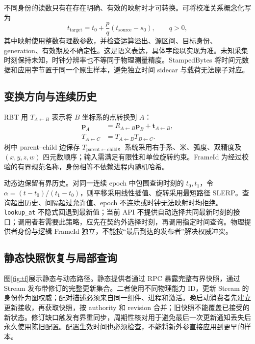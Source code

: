 \documentclass[UTF8,fontset=none,zihao=-4,a4paper]{ctexart}
\newcommand{\code}[1]{\texttt{#1}}
\begin{document}
不同身份的读数只有在存在明确、有效的映射时才可转换。可将校准关系概念化写为
\begin{equation}
 t_{\mathrm{target}}=t_0+\frac{p}{q}(t_{\mathrm{source}}-s_0),
 \qquad q>0,
\end{equation}
其中映射使用整数有理数参数，并检查运算溢出、源区间、目标身份、generation、有效期及不确定性。这是语义表达，具体字段以实现为准。未知采集时刻保持未知，时钟分辨率也不等同于物理测量精度。StampedBytes 将时间元数据和应用字节置于同一个原生样本，避免独立时间 sidecar 与载荷无法原子对应\cite{rbttime}。

\subsection{变换方向与连续历史}
RBT 用 $T_{A\leftarrow B}$ 表示将 $B$ 坐标系的点转换到 $A$：
\begin{align}
 \mathbf p_A &= R_{A\leftarrow B}\mathbf p_B+\mathbf t_{A\leftarrow B},\\
 T_{A\leftarrow C} &= T_{A\leftarrow B}T_{B\leftarrow C}.
\end{align}
树中 parent--child 边保存 $T_{\mathrm{parent}\leftarrow\mathrm{child}}$。系统采用右手系、米、弧度、双精度及 $(x,y,z,w)$ 四元数顺序；输入需满足有限性和单位旋转约束。FrameId 为经过校验的有界规范名称，身份相等不依赖进程内随机哈希。

动态边保留有界历史。对同一连续 epoch 中包围查询时刻的 $t_0,t_1$，令 $\alpha=(t-t_0)/(t_1-t_0)$，则平移采用线性插值、旋转采用最短路径 SLERP。查询超出历史、间隔超过允许值、epoch 不连续或时钟无法映射时均拒绝。\code{lookup\_at} 不隐式回退到最新值；当前 API 不提供自动选择共同最新时刻的接口；调用者若需要此策略，应先在契约外选择时刻，再调用指定时间查询。物理提供者身份与逻辑 FrameId 独立，不能按“最后到达的发布者”解决权威冲突。

\subsection{静态快照恢复与局部查询}
图\ref{fig:tf}展示静态与动态路径。静态提供者通过 RPC 暴露完整有界快照，通过 Stream 发布带修订的完整更新集合。二者使用不同物理能力 ID，更新 Stream 的身份作为图权威；配对描述必须来自同一组件、进程和激活。晚启动消费者先建立更新接收，再获取快照，按 authority 和 revision 合并；旧快照不能覆盖已接受的新状态。修订缺口触发有界重同步，周期性核对用于避免最后一次更新通知丢失后永久使用陈旧配置。配置生效时间也必须检查，不能将新外参直接应用到更早的样本。
\end{document}
